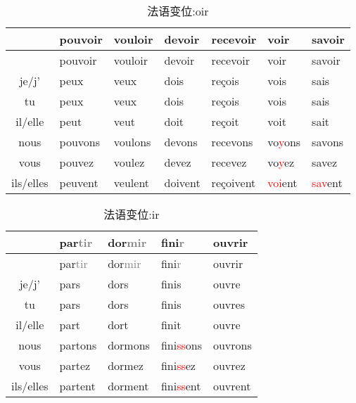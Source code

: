 \documentclass[12pt,A4paper,oneside,reqno]{amsart}
\numberwithin{equation}{section}
\theoremstyle{plain}
\theoremstyle{plain}
\theoremstyle{plain}
\numberwithin{equation}{section}
\theoremstyle{remark}
\begin{document}
	\begin{longtable}{c|l|l||l|l|l|l}
	\hline
	&	pouvoir	&	vouloir	&	devoir	&	recevoir	&	voir	&	savoir	\\

	\hline
	\endhead
	\hline
	&	pouvoir	&	vouloir	&	devoir	&	recevoir	&	voir	&	savoir	\\

	\hline
	\endfirsthead	
	\hline
	\endfoot
	\hline		
	\caption{法语变位:oir}
	\endlastfoot

																				
je/j'	&	peux	&	veux	&	dois	&	reçois	&	vois	&	sais	\\
tu	&	peux	&	veux	&	dois	&	reçois	&	vois	&	sais	\\
il/elle	&	peut	&	veut	&	doit	&	reçoit	&	voit	&	sait	\\
nous	&	pouvons	&	voulons	&	devons	&	recevons	&	vo\textcolor{red}{y}ons	&	savons	\\
vous	&	pouvez	&	voulez	&	devez	&	recevez	&	vo\textcolor{red}{y}ez	&	savez	\\
ils/elles	&	peuvent	&	veulent	&	doivent	&	reçoivent	&	\textcolor{red}{voi}ent	&	\textcolor{red}{sav}ent	\\

	
	\hline								
\end{longtable}
	\begin{longtable}{c|l|l|l||l}
	\hline
	&	par\textcolor{gray}{tir}	&	dor\textcolor{gray}{mir}	&	fini\textcolor{gray}{r}	&	ouvrir	\\


	\hline
	\endhead
	\hline
	&	par\textcolor{gray}{tir}	&	dor\textcolor{gray}{mir}	&	fini\textcolor{gray}{r}	&	ouvrir	\\


	\hline
	\endfirsthead	
	\hline
	\endfoot
	\hline		
	\caption{法语变位:ir}
	\endlastfoot
	
je/j'	&	pars	&	dors	&	finis	&	ouvre	\\
tu	&	pars	&	dors	&	finis	&	ouvres	\\
il/elle	&	part	&	dort	&	finit	&	ouvre	\\
nous	&	partons	&	dormons	&	fini\textcolor{red}{ss}ons	&	ouvrons	\\
vous	&	partez	&	dormez	&	fini\textcolor{red}{ss}ez	&	ouvrez	\\
ils/elles	&	partent	&	dorment	&	fini\textcolor{red}{ss}ent	&	ouvrent	\\


	\hline								
\end{longtable}
\end{document}
